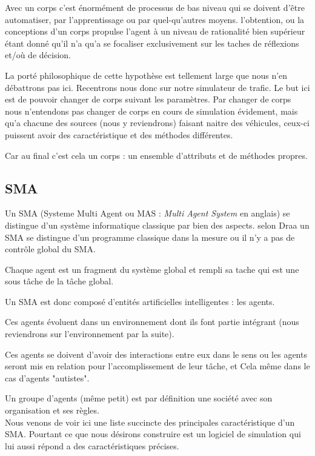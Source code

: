 \documentclass[a4paper,11pt]{article}
\begin{document}
Avec un corps c'est énormément de processus de bas niveau qui se doivent d'être automatiser, par l'apprentissage ou par quel-qu'autres moyens. l'obtention, ou la conceptions d'un corps propulse l'agent à un niveau de rationalité bien supérieur étant donné qu'il n'a qu'a se focaliser exclusivement sur les taches de réflexions et/où de décision.

La porté philosophique de cette hypothèse est tellement large que nous n'en débattrons pas ici. Recentrons nous donc sur notre simulateur de trafic. Le but ici est de pouvoir changer de corps suivant les paramètres. Par changer de corps nous n'entendons pas changer de corps en cours de simulation évidement, mais qu'a chacune des sources (nous y reviendrons) faisant naitre des véhicules, ceux-ci puissent avoir des caractéristique et des méthodes différentes. 

Car au final c'est cela un corps : un ensemble d'attributs et de méthodes propres.

\subsection{SMA}

Un SMA (Systeme Multi Agent ou MAS : \textit{Multi Agent System} en anglais) se distingue d'un système informatique classique par bien des aspects. selon Draa \cite{Draa2001} un SMA se distingue d'un programme classique dans la mesure ou il n'y a pas de contrôle global du SMA. 

Chaque agent est un fragment du système global et rempli sa tache qui est une sous tâche de la tâche global. 

Un SMA est donc composé d'entités artificielles intelligentes : les agents. 

Ces agents évoluent dans un environnement dont ils font partie intégrant (nous reviendrons sur l'environnement par la suite). 

Ces agents se doivent d'avoir des interactions entre eux dans le sens ou les agents seront mis en relation pour l'accomplissement de leur tâche, et Cela même dans le cas d'agents "autistes".

Un groupe d'agents (même petit) est par définition une société avec son organisation et ses règles. \\

Nous venons de voir ici une liste succincte des principales caractéristique d'un SMA. Pourtant ce que nous désirons construire est un logiciel de simulation qui lui aussi répond a des caractéristiques précises.
\end{document}
